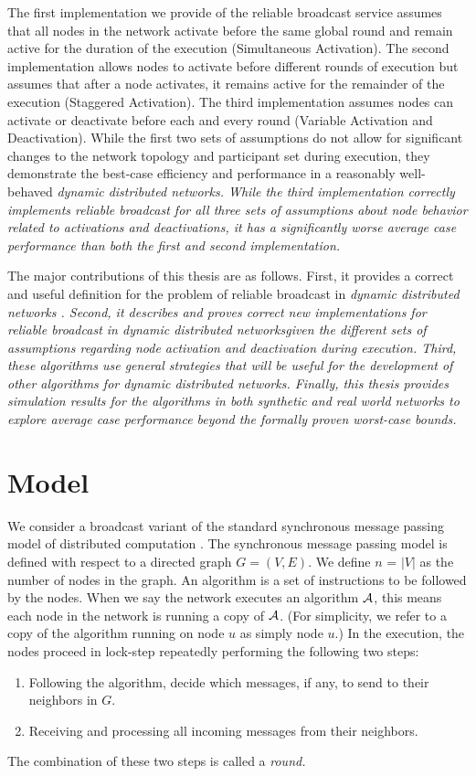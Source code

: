 \documentclass[english]{article}
\begin{document}
The first implementation we provide of the reliable broadcast service assumes that all nodes in the network activate before the same global round and remain active for the duration of the execution (Simultaneous Activation). The second implementation allows nodes to activate before different rounds of execution but assumes that after a node activates, it remains active for the remainder of the execution (Staggered Activation).  The third implementation assumes nodes can activate or deactivate before each and every round (Variable Activation and Deactivation). While the first two sets of assumptions do not allow for significant changes to the network topology and participant set during execution, they demonstrate the best-case efficiency and performance in a reasonably well-behaved \em dynamic distributed networks\em. While the third implementation correctly implements reliable broadcast for all three sets of assumptions about node behavior related to activations and deactivations, it has a significantly worse average case performance than both the first and second implementation. 

The major contributions of this thesis are as follows. First, it provides a correct and useful definition for the problem of reliable broadcast in \em dynamic distributed networks \em. Second, it describes and proves correct new implementations for reliable broadcast in \em dynamic distributed networks\em given the different sets of assumptions regarding node activation and deactivation during execution. Third, these algorithms use general strategies that will be useful for the development of other algorithms for \em dynamic distributed networks\em. Finally, this thesis provides simulation results for the algorithms in both synthetic and real world networks to explore average case performance beyond the formally proven worst-case bounds.

\section{Model}


We consider a broadcast variant of the standard synchronous message passing model of distributed computation \cite{Lynch:1996, Kuhn:2010}. The synchronous message passing model is defined with respect to a directed graph $G=(V,E)$. We define $n$ = $|V|$ as the number of nodes in the graph. An algorithm is a set of instructions to be followed by the nodes. When we say the network executes an algorithm $\cal A$, this means each node in the network is running a copy of $\cal A$. (For simplicity, we refer to a copy of the algorithm running on node $u$ as simply node $u$.) In the execution, the nodes proceed in lock-step repeatedly performing the following two steps:
\begin{enumerate}
  \item Following the algorithm, decide which messages, if any, to send to their neighbors in $G$.
  \item Receiving and processing all incoming messages from their neighbors.
\end{enumerate}
The combination of these two steps is called a \em round\em.
\end{document}

